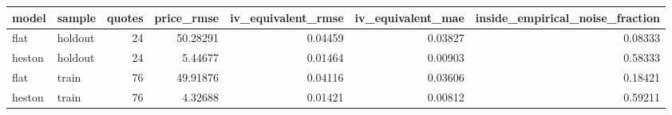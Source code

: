 \begin{tabular}{llrrrrr}
\toprule
model & sample & quotes & price\_rmse & iv\_equivalent\_rmse & iv\_equivalent\_mae & inside\_empirical\_noise\_fraction \\
\midrule
flat & holdout & 24 & 50.28291 & 0.04459 & 0.03827 & 0.08333 \\
heston & holdout & 24 & 5.44677 & 0.01464 & 0.00903 & 0.58333 \\
flat & train & 76 & 49.91876 & 0.04116 & 0.03606 & 0.18421 \\
heston & train & 76 & 4.32688 & 0.01421 & 0.00812 & 0.59211 \\
\bottomrule
\end{tabular}
